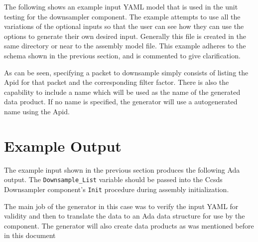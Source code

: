 The following shows an example input YAML model that is used in the unit testing for the downsampler component. The example attempts to use all the variations of the optional inputs so that the user can see how they can use the options to generate their own desired input. Generally this file is created in the same directory or near to the assembly model file. This example adheres to the schema shown in the previous section, and is commented to give clarification.


As can be seen, specifying a packet to downsample simply consists of listing the Apid for that packet and the corresponding filter factor. There is also the capability to include a name which will be used as the name of the generated data product. If no name is specified, the generator will use a autogenerated name using the Apid. 

\section{Example Output}

The example input shown in the previous section produces the following Ada output. The \texttt{Downsample\_List} variable should be passed into the Ccsds Downsampler component's \texttt{Init} procedure during assembly initialization.

The main job of the generator in this case was to verify the input YAML for validity and then to translate the data to an Ada data structure for use by the component. The generator will also create data products as was mentioned before in this document




